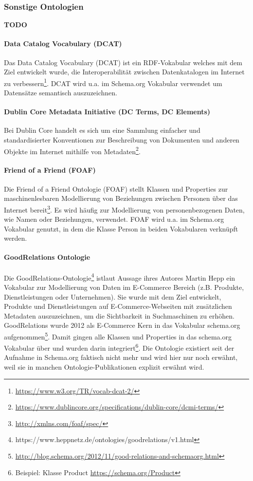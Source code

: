 \documentclass{article}
\begin{document}
\subsubsection{Sonstige Ontologien}

\textbf{TODO}

\paragraph{Data Catalog Vocabulary (DCAT)}

Das Data Catalog Vocabulary (DCAT) ist ein RDF-Vokabular welches mit dem Ziel entwickelt wurde, die Interoperabilität zwischen Datenkatalogen im Internet zu verbessern\footnote{\url{https://www.w3.org/TR/vocab-dcat-2/}}.
DCAT wird u.a. im Schema.org Vokabular verwendet um Datensätze semantisch auszuzeichnen.

\paragraph{Dublin Core Metadata Initiative (DC Terms, DC Elements)}

Bei Dublin Core handelt es sich um eine Sammlung einfacher und standardisierter Konventionen zur Beschreibung von Dokumenten und anderen Objekte im Internet mithilfe von Metadaten\footnote{\url{https://www.dublincore.org/specifications/dublin-core/dcmi-terms/}}.

\paragraph{Friend of a Friend (FOAF)}

Die Friend of a Friend Ontologie (FOAF) stellt Klassen und Properties zur maschinenlesbaren Modellierung von Beziehungen zwischen Personen über das Internet bereit\footnote{\url{http://xmlns.com/foaf/spec/}}.
Es wird häufig zur Modellierung von personenbezogenen Daten, wie Namen oder Beziehungen, verwendet.
FOAF wird u.a. im Schema.org Vokabular genutzt, in dem die Klasse Person in beiden Vokabularen verknüpft werden.

\paragraph{GoodRelations Ontologie}

Die GoodRelations-Ontologie\footnote{https://www.heppnetz.de/ontologies/goodrelations/v1.html} istlaut Aussage ihres Autores Martin Hepp ein Vokabular zur Modellierung von Daten im E-Commerce Bereich (z.B. Produkte, Dienstleistungen oder Unternehmen).
Sie wurde mit dem Ziel entwickelt, Produkte und Dienstleistungen auf E-Commerce-Webseiten mit zusätzlichen Metadaten auszuzeichnen, um die Sichtbarkeit in Suchmaschinen zu erhöhen.
GoodRelations wurde 2012 als E-Commerce Kern in das Vokabular schema.org aufgenommen\footnote{\url{http://blog.schema.org/2012/11/good-relations-and-schemaorg.html}}.
Damit gingen alle Klassen und Properties in das schema.org Vokabular über und wurden darin integriert\footnote{Beispiel: Klasse Product \url{https://schema.org/Product}}.
Die Ontologie existiert seit der Aufnahme in Schema.org faktisch nicht mehr und wird hier nur noch erwähnt, weil sie in manchen Ontologie-Publikationen explizit erwähnt wird.
\end{document}
